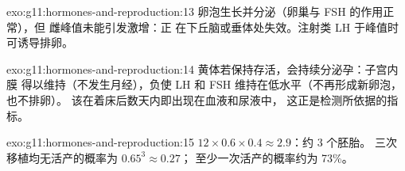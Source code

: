 \begin{solution}{exo:g11:hormones-and-reproduction:13}
卵泡生长并分泌（卵巢与 FSH 的作用正常），但
雌峰值未能引发激增：正
在下丘脑或垂体处失效。注射类 LH 
于峰值时可诱导排卵。
\end{solution}

\begin{solution}{exo:g11:hormones-and-reproduction:14}
黄体若保持存活，会持续分泌孕：子宫内膜
得以维持（不发生月经），负使 LH
和 FSH 维持在低水平（不再形成新卵泡，也不排卵）。
该在着床后数天内即出现在血液和尿液中，
这正是检测所依据的指标。
\end{solution}

\begin{solution}{exo:g11:hormones-and-reproduction:15}
$12 \times 0.6 \times 0.4 \approx 2.9$：约 3 个胚胎。
三次移植均无活产的概率为 $0.65^3 \approx 0.27$；
至少一次活产的概率约为 73\%。
\end{solution}

